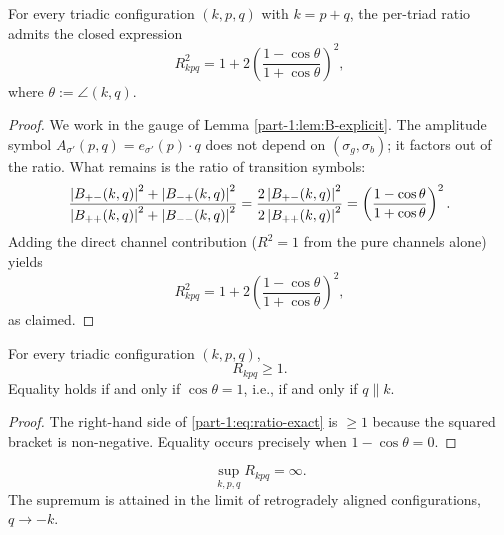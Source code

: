 \begin{theorem}\label{part-1:thm:ratio-exact}
For every triadic configuration $(k,p,q)$ with $k=p+q$, the 
per-triad ratio admits the closed expression
\begin{equation}\label{part-1:eq:ratio-exact}
\boxed{
R_{kpq}^2 = 1 + 2\left(\frac{1-\cos\theta}{1+\cos\theta}\right)^2,
}
\end{equation}
where $\theta := \angle(k,q)$.
\end{theorem}

\begin{proof}
We work in the gauge of Lemma \ref{part-1:lem:B-explicit}. The amplitude 
symbol $A_{\sigma'}(p,q) = e_{\sigma'}(p)\cdot q$ does not depend on 
$(\sigma_g,\sigma_b)$; it factors out of the ratio. What remains is 
the ratio of transition symbols:
\begin{equation*}
\frac{\left\lvert B_{+-}(k,q) \right\rvert^2 + \left\lvert B_{-+}(k,q) \right\rvert^2}
     {\left\lvert B_{++}(k,q) \right\rvert^2 + \left\lvert B_{--}(k,q) \right\rvert^2}
= \frac{2\left\lvert B_{+-}(k,q) \right\rvert^2}{2\left\lvert B_{++}(k,q) \right\rvert^2}
= \left(\frac{1-\cos\theta}{1+\cos\theta}\right)^2.
\end{equation*}
Adding the direct channel contribution ($R^2 = 1$ from the pure 
channels alone) yields
\begin{equation*}
R_{kpq}^2 = 1 + 2\left(\frac{1-\cos\theta}{1+\cos\theta}\right)^2,
\end{equation*}
as claimed.
\end{proof}

\begin{corollary}\label{part-1:cor:ratio-lower}
For every triadic configuration $(k,p,q)$,
\begin{equation}\label{part-1:eq:ratio-lower}
\boxed{
R_{kpq} \geq 1.
}
\end{equation}
Equality holds if and only if $\cos\theta = 1$, i.e., if and only if 
$q\parallel k$.
\end{corollary}

\begin{proof}
The right-hand side of \eqref{part-1:eq:ratio-exact} is $\geq 1$ because the 
squared bracket is non-negative. Equality occurs precisely when 
$1-\cos\theta = 0$.
\end{proof}

\begin{corollary}\label{part-1:cor:ratio-upper}
\begin{equation}\label{part-1:eq:ratio-upper}
\sup_{k,p,q} R_{kpq} = \infty.
\end{equation}
The supremum is attained in the limit of retrogradely aligned 
configurations, $q\to -k$.
\end{corollary}

